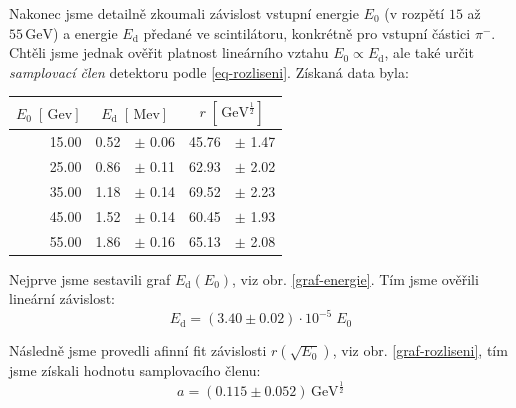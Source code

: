 \documentclass[10pt,a4paper]{article}
\renewcommand{\U}[1]{\ensuremath{\,\mathrm{#1}}}
\newcommand{\°}{\degree}
\begin{document}


Nakonec jsme detailně zkoumali závislost vstupní energie $E_0$ (v rozpětí $15$ až $55 \U{GeV}$) a energie $E_{\mathrm d}$ předané ve scintilátoru, konkrétně pro vstupní částici $\pi^-$. Chtěli jsme jednak ověřit platnost lineárního vztahu $E_0 \propto E_{\mathrm d}$, ale také určit \textit{samplovací člen} detektoru podle \eqref{eq-rozliseni}. Získaná data byla:

\phantom{.}
\begin{minipage}{\linewidth}
    \vspace{\baselineskip}
    \centering
    \begin{tabular}{ r|rl|rl }
        $E_0 \; [\U{Gev}]$ &
        \multicolumn{2}{c|}{$E_{\mathrm d} \; [\U{Mev}]$} &
        \multicolumn{2}{c}{$r \; [\U{GeV^{\frac{1}{2}}}]$}
        \\\hline
        15.00 &	0.52 &	$\pm$ 0.06 &	45.76 &	$\pm$ 1.47 \\
        25.00 &	0.86 &	$\pm$ 0.11 &	62.93 &	$\pm$ 2.02 \\
        35.00 &	1.18 &	$\pm$ 0.14 &	69.52 &	$\pm$ 2.23 \\
        45.00 &	1.52 &	$\pm$ 0.14 &	60.45 &	$\pm$ 1.93 \\
        55.00 &	1.86 &	$\pm$ 0.16 &	65.13 &	$\pm$ 2.08
    \end{tabular}
    \medskip
    \label{}
    \vspace{\baselineskip}
\end{minipage}

Nejprve jsme sestavili graf $E_{\mathrm d}(E_0)$, viz obr. \ref{graf-energie}. Tím jsme ověřili lineární závislost:
\begin{equation*}
    E_{\mathrm d} = (3.40 \pm 0.02) \cdot 10^{-5} \; E_0
\end{equation*}

Následně jsme provedli afinní fit závislosti $r(\sqrt{E_0})$, viz obr. \ref{graf-rozliseni}, tím jsme získali hodnotu samplovacího členu:
\begin{equation*}
    a = (0.115 \pm 0.052) \U{GeV^{\frac{1}{2}}}
\end{equation*}

\vspace{3\baselineskip}
\end{document}
